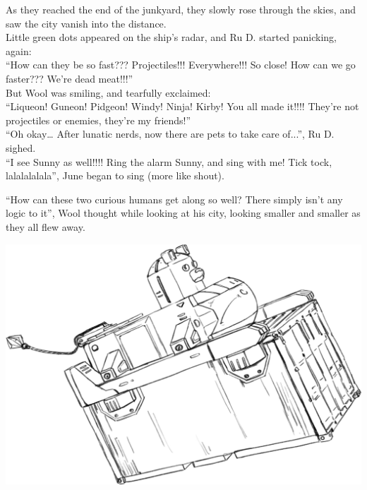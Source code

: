 As they reached the end of the junkyard, they slowly rose through the skies, and saw the city vanish into the distance.\\
Little green dots appeared on the ship's radar, and Ru D. started panicking, again:\\
``How can they be so fast??? Projectiles!!! Everywhere!!! So close! How can we go faster??? We’re dead meat!!!''\\
But Wool was smiling, and tearfully exclaimed:\\
``Liqueon! Guneon! Pidgeon! Windy! Ninja! Kirby! You all made it!!!! They’re not projectiles or enemies, they’re my friends!'' \\
``Oh okay… After lunatic nerds, now there are pets to take care of...'', Ru D. sighed.\\
``I see Sunny as well!!!! Ring the alarm Sunny, and sing with me! Tick tock, lalalalalala'', June began to sing (more like shout).


``How can these two curious humans get along so well? There simply isn't any logic to it'', Wool thought while looking at his city, looking smaller and smaller as they all flew away.

\begin{center}
    \includegraphics[width=.8\textwidth]{Assets/shipwithcontainer}    
\end{center}
